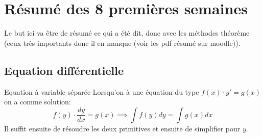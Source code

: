 \section{Résumé des 8 premières semaines}
Le but ici va être de résumé ce qui a été dit, donc avec les méthodes théorème (ceux très importants donc il en manque (voir les pdf résumé sur moodle)). 
\subsection{Equation différentielle}
\begin{parag}{Equation à variable séparée}
    Lorsqu'on à une équation du type $f\left(x\right)\cdot y' = g\left(x\right)$ on a comme solution:
   \begin{equation*} f\left(y\right)\cdot \frac{dy}{dx} = g\left(x\right) \implies \int f\left(y\right)dy = \int g\left(x\right)dx \end{equation*} 
   Il suffit ensuite de résoudre les deux primitives et ensuite de simplifier pour $y$.
\end{parag}
 
